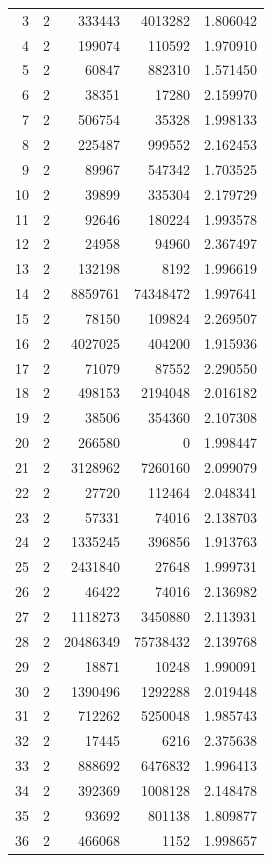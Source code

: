 \begin{longtable}{rrrrr}
3 & 2 & 333443 & 4013282 & 1.806042\\
4 & 2 & 199074 & 110592 & 1.970910\\
5 & 2 & 60847 & 882310 & 1.571450\\
6 & 2 & 38351 & 17280 & 2.159970\\
7 & 2 & 506754 & 35328 & 1.998133\\
8 & 2 & 225487 & 999552 & 2.162453\\
9 & 2 & 89967 & 547342 & 1.703525\\
10 & 2 & 39899 & 335304 & 2.179729\\
11 & 2 & 92646 & 180224 & 1.993578\\
12 & 2 & 24958 & 94960 & 2.367497\\
13 & 2 & 132198 & 8192 & 1.996619\\
14 & 2 & 8859761 & 74348472 & 1.997641\\
15 & 2 & 78150 & 109824 & 2.269507\\
16 & 2 & 4027025 & 404200 & 1.915936\\
17 & 2 & 71079 & 87552 & 2.290550\\
18 & 2 & 498153 & 2194048 & 2.016182\\
19 & 2 & 38506 & 354360 & 2.107308\\
20 & 2 & 266580 & 0 & 1.998447\\
21 & 2 & 3128962 & 7260160 & 2.099079\\
22 & 2 & 27720 & 112464 & 2.048341\\
23 & 2 & 57331 & 74016 & 2.138703\\
24 & 2 & 1335245 & 396856 & 1.913763\\
25 & 2 & 2431840 & 27648 & 1.999731\\
26 & 2 & 46422 & 74016 & 2.136982\\
27 & 2 & 1118273 & 3450880 & 2.113931\\
28 & 2 & 20486349 & 75738432 & 2.139768\\
29 & 2 & 18871 & 10248 & 1.990091\\
30 & 2 & 1390496 & 1292288 & 2.019448\\
31 & 2 & 712262 & 5250048 & 1.985743\\
32 & 2 & 17445 & 6216 & 2.375638\\
33 & 2 & 888692 & 6476832 & 1.996413\\
34 & 2 & 392369 & 1008128 & 2.148478\\
35 & 2 & 93692 & 801138 & 1.809877\\
36 & 2 & 466068 & 1152 & 1.998657\\

\end{longtable}

